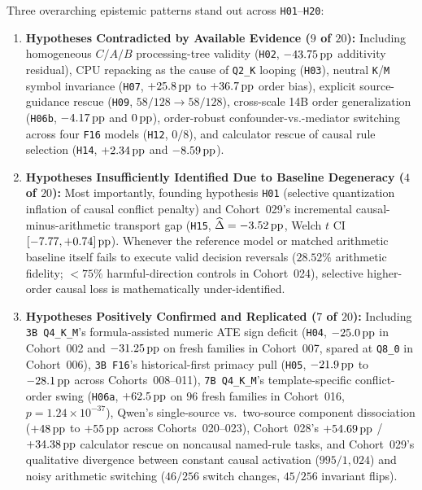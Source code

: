 Three overarching epistemic patterns stand out across \texttt{H01}--\texttt{H20}:
\begin{enumerate}
  \item \textbf{Hypotheses Contradicted by Available Evidence ($9$ of $20$):} Including homogeneous $C/A/B$ processing-tree validity (\texttt{H02}, $-43.75\,\mathrm{pp}$ additivity residual), CPU repacking as the cause of \texttt{Q2\_K} looping (\texttt{H03}), neutral \texttt{K}/\texttt{M} symbol invariance (\texttt{H07}, $+25.8\,\mathrm{pp}$ to $+36.7\,\mathrm{pp}$ order bias), explicit source-guidance rescue (\texttt{H09}, $58/128 \to 58/128$), cross-scale 14B order generalization (\texttt{H06b}, $-4.17\,\mathrm{pp}$ and $0\,\mathrm{pp}$), order-robust confounder-vs.-mediator switching across four \texttt{F16} models (\texttt{H12}, $0/8$), and calculator rescue of causal rule selection (\texttt{H14}, $+2.34\,\mathrm{pp}$ and $-8.59\,\mathrm{pp}$).
  \item \textbf{Hypotheses Insufficiently Identified Due to Baseline Degeneracy ($4$ of $20$):} Most importantly, founding hypothesis \texttt{H01} (selective quantization inflation of causal conflict penalty) and Cohort~029's incremental causal-minus-arithmetic transport gap (\texttt{H15}, $\widehat{\Delta} = -3.52\,\mathrm{pp}$, Welch $t$ CI $[-7.77, +0.74]\,\mathrm{pp}$). Whenever the reference model or matched arithmetic baseline itself fails to execute valid decision reversals ($28.52\%$ arithmetic fidelity; $<75\%$ harmful-direction controls in Cohort~024), selective higher-order causal loss is mathematically under-identified.
  \item \textbf{Hypotheses Positively Confirmed and Replicated ($7$ of $20$):} Including \texttt{3B Q4\_K\_M}'s formula-assisted numeric ATE sign deficit (\texttt{H04}, $-25.0\,\mathrm{pp}$ in Cohort~002 and $-31.25\,\mathrm{pp}$ on fresh families in Cohort~007, spared at \texttt{Q8\_0} in Cohort~006), \texttt{3B F16}'s historical-first primacy pull (\texttt{H05}, $-21.9\,\mathrm{pp}$ to $-28.1\,\mathrm{pp}$ across Cohorts~008--011), \texttt{7B Q4\_K\_M}'s template-specific conflict-order swing (\texttt{H06a}, $+62.5\,\mathrm{pp}$ on $96$ fresh families in Cohort~016, $p = 1.24\times 10^{-37}$), Qwen's single-source vs.\ two-source component dissociation ($+48\,\mathrm{pp}$ to $+55\,\mathrm{pp}$ across Cohorts~020--023), Cohort~028's $+54.69\,\mathrm{pp}$ / $+34.38\,\mathrm{pp}$ calculator rescue on noncausal named-rule tasks, and Cohort~029's qualitative divergence between constant causal activation ($995/1{,}024$) and noisy arithmetic switching ($46/256$ switch changes, $45/256$ invariant flips).
\end{enumerate}

